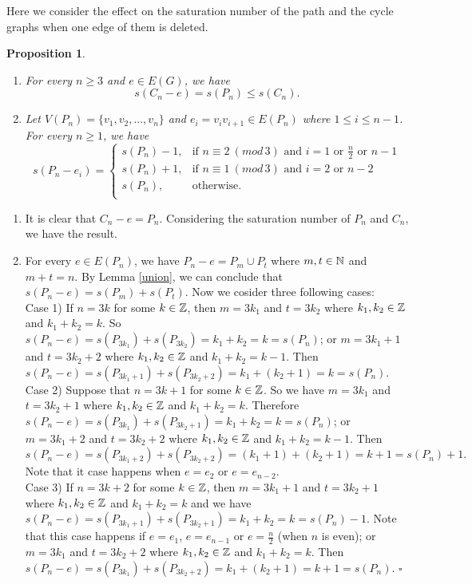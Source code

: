\documentclass[11pt]{article}
\newtheorem{proposition}[theorem]{Proposition}
\newcommand{\proof}{\noindent{\bf Proof.\ }}
\newcommand{\qed}{\hfill $\square$\medskip}
\begin{document}
\medskip
Here we consider the effect on the saturation number of the path and the cycle graphs when one edge of them is deleted.

\begin{proposition}
    \begin{enumerate}
           \item [(i)] For every $n\geq 3$ and $e\in E(G)$, we have $$s({C_n}-e)=s(P_n)\leq s(C_n).$$
           \item [(ii)] Let $V(P_n)=\{v_1,v_2,...,v_n\}$ and $e_i=v_iv_{i+1} \in E(P_n)$ where $1\leq i\leq n-1$. For every $n\geq 1$, we have 
\begin{equation*}  
s({P_n}-{e_i})=\left\{
\begin{array}{ll}   
s(P_n)-1, & \text{if $n\equiv 2 ~ (mod\, 3)$ and $i=1$ or $\frac{n}{2}$ or $n-1$} \\
s(P_n)+1, & \text{if $n\equiv 1 ~ (mod\, 3)$ and $i=2$ or $n-2$} \\
s(P_n), & \text{otherwise.}\\
\end{array} \right.
\end{equation*}
    \end{enumerate}
\end{proposition}

\proof
 \begin{enumerate}
      \item [(i)] It is clear that $C_n-e=P_n$. Considering the saturation number of $P_n$ and $C_n$, we have the result.
       \item[(ii)] For every $e\in E(P_n)$, we have ${P_n}-e={P_m}\cup {P_t}$ where $m,t\in \Bbb{N}$ and $m+t=n$. By Lemma \ref{union}, we can conclude that $s({P_n}-e)=s(P_m)+s(P_t)$. Now we cosider three following cases: \\
Case 1) If $n=3k$ for some $k\in \Bbb{Z}$, then $m=3k_1$ and $t=3k_2$ where $k_1, k_2\in \Bbb{Z}$ and $k_1+k_2=k$.  So $s({P_n}-e)=s(P_{3k_1})+s(P_{3k_2})=k_1+k_2=k=s(P_n)$; or $m=3k_1+1$ and $t=3k_2+2$ where $k_1, k_2\in \Bbb{Z}$ and $k_1+k_2=k-1$. Then $s({P_n}-e)=s(P_{3k_1+1})+s(P_{3k_2+2})=k_1+(k_2+1)=k=s(P_n).$ \\
Case 2) Suppose that $n=3k+1$ for some $k\in \Bbb{Z}$. So we have $m=3k_1$ and $t=3k_2+1$ where $k_1, k_2\in \Bbb{Z}$ and $k_1+k_2=k$. Therefore $s({P_n}-e)=s(P_{3k_1})+s(P_{3k_2+1})=k_1+k_2=k=s(P_n)$; or $m=3k_1+2$ and $t=3k_2+2$ where $k_1, k_2\in \Bbb{Z}$ and $k_1+k_2=k-1$. Then $s({P_n}-e)=s(P_{3k_1+2})+s(P_{3k_2+2})=(k_1+1)+(k_2+1)=k+1=s(P_n)+1.$ Note that it case happens when $e=e_2$ or $e=e_{n-2}$. \\
Case 3) If $n=3k+2$ for some $k\in \Bbb{Z}$, then $m=3k_1+1$ and $t=3k_2+1$ where $k_1, k_2\in \Bbb{Z}$ and $k_1+k_2=k$ and we have $s({P_n}-e)=s(P_{3k_1+1})+s(P_{3k_2+1})=k_1+k_2=k=s(P_n)-1.$
Note that this case happens if $e=e_1$, $e=e_{n-1}$ or $e=\frac{n}{2}$ (when $n$ is even); or $m=3k_1$ and $t=3k_2+2$ where $k_1, k_2\in \Bbb{Z}$ and $k_1+k_2=k$. Then $s({P_n}-e)=s(P_{3k_1})+s(P_{3k_2+2})=
k_1+(k_2+1)=k+1=s(P_n).$
\qed
\end{enumerate}
\end{document}
